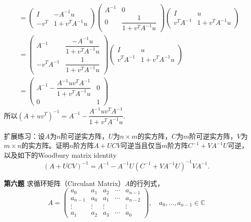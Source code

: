 \begin{align*}
& = \begin{pmatrix} I & -A^{-1}u \\ -v^T & 1 + v^TA^{-1}u \end{pmatrix} \begin{pmatrix} A^{-1} & 0 \\ 0 & \dfrac{1}{1 + v^TA^{-1}u} \end{pmatrix} \begin{pmatrix} I & u \\ v^TA^{-1} & 1 + v^TA^{-1}u \end{pmatrix} \\
& = \begin{pmatrix} A^{-1} & \dfrac{-A^{-1}u}{1 + v^TA^{-1}u} \\ -v^T A^{-1} & \dfrac{1}{1 + v^TA^{-1}u} \end{pmatrix} \begin{pmatrix} I & u \\ v^TA^{-1} & 1 + v^TA^{-1}u \end{pmatrix} \\
& = \begin{pmatrix} A^{-1} - \dfrac{ A^{-1}uv^TA^{-1}}{1 + v^TA^{-1}u} & 0 \\ 0 & 1 \end{pmatrix}
\end{align*}
所以$(A + uv^T)^{-1} = A^{-1} - \dfrac{ A^{-1}uv^TA^{-1}}{1 + v^TA^{-1}u}.$

\vspace{2em}

扩展练习：设$A$为$n$阶可逆实方阵，$U$为$n\times m$的实方阵，$C$为$m$阶可逆实方阵，$V$为$m\times n$的实方阵。证明$n$阶方阵$A + UCV$可逆当且仅当$m$阶方阵$C^{-1} + VA^{-1}U$可逆，以及如下的Woodbury matrix identity
$$\left( A + UCV \right)^{-1} = A^{-1} - A^{-1} U \left( C^{-1} + VA^{-1}U \right)^{-1} V A^{-1}.$$

\fi  %

\newpageorvspace

{\bf 第六题} 求循环矩阵（Circulant Matrix）$A$的行列式，
$$A = \begin{pmatrix} a_0 & a_1 & a_2 & \cdots & a_{n-1} \\ a_{n-1} & a_0 & a_1 & \cdots & a_{n-2} \\ \vdots & \vdots & \vdots & & \vdots \\ a_1 & a_2 & a_3 & \cdots & a_0 \end{pmatrix}, \quad a_0,\ldots,a_{n-1} \in \mathbb{C}$$

\ifIncludeAnswer

